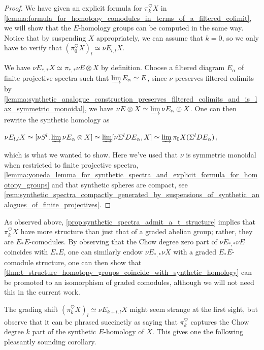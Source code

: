 \documentclass[oneside,a4paper]{amsart}
\theoremstyle{plain}
\theoremstyle{definition}
\theoremstyle{remark}
\begin{document}
\begin{proof}
We have given an explicit formula for $\pi_{k}^{\heartsuit} X$ in \cref{lemma:formula_for_homotopy_comodules_in_terms_of_a_filtered_colimit}, we will show that the $E$-homology groups can be computed in the same way. Notice that by suspending $X$ appropriately, we can assume that $k = 0$, so we only have to verify that $(\pi_{0}^{\heartsuit} X)_{l} \simeq \nu E_{l, l} X$. 

We have $\nu E_{*, *} X \simeq \pi_{*, *} \nu E \otimes X$ by definition. Choose a filtered diagram $E_{\alpha}$ of finite projective spectra such that $\varinjlim E_{\alpha} \simeq E$, since $\nu$ preserves filtered colimits by \cref{lemma:synthetic_analogue_construction_preserves_filtered_colimits_and_is_lax_symmetric_monoidal}, we have $\nu E \otimes X \simeq \varinjlim \nu E_{\alpha} \otimes X$. One can then rewrite the synthetic homology as 

\begin{center}
$\nu E_{l, l} X \simeq [\nu S^{l}, \varinjlim \nu E_{\alpha} \otimes X] \simeq \varinjlim [\nu \Sigma^{l} DE_{\alpha}, X] \simeq \varinjlim \pi_{0} X(\Sigma^{l}DE_{\alpha})$,
\end{center}
which is what we wanted to show. Here we've used that $\nu$ is symmetric monoidal when restricted to finite projective spectra, \cref{lemma:yoneda_lemma_for_synthetic_spectra_and_explicit_formula_for_homotopy_groups} and that synthetic spheres are compact, see \cref{rem:synthetic_spectra_compactly_generated_by_suspensions_of_synthetic_analogues_of_finite_projectives}. 
\end{proof}
As observed above, \cref{prop:synthetic_spectra_admit_a_t_structure} implies that $\pi_{k}^{\heartsuit} X$ have more structure than just that of a graded abelian group; rather, they are $E_{*}E$-comodules. By observing that the Chow degree zero part of $\nu E_{*, *} \nu E$ coincides with $E_{*}E$, one can similarly endow $\nu E_{*, *} \nu X$ with a graded $E_{*}E$-comodule structure, one can then show that \cref{thm:t_structure_homotopy_groups_coincide_with_synthetic_homology} can be promoted to an isomorphism of graded comodules, although we will not need this in the current work. 

The grading shift $(\pi_{k}^{\heartsuit} X)_{l} \simeq \nu E_{k+l, l}X$ might seem strange at the first sight, but observe that it can be phrased succinctly as saying that $\pi_{k}^{\heartsuit}$ captures the Chow degree $k$ part of the synthetic $E$-homology of $X$. This gives one the following pleasantly sounding corollary. 
\end{document}
